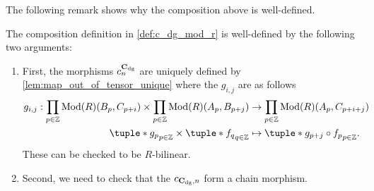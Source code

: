 The following remark shows why the composition above is well-defined.

\begin{remark}
    The composition definition in \autoref{def:c_dg_mod_r} is well-defined by the following two arguments:

    \begin{enumerate}
        \item {
            First, the morphisms \( c_n^{\operatorname{\mathbf{C}}_{\operatorname{dg}}} \) are uniquely defined by \autoref{lem:map_out_of_tensor_unique} where the \( g_{i, j} \) are as follows
            \begin{align*}
                g_{i, j}: \prod_{p \in \Zb} \Mod(R)(B_p, C_{p + i}) \times \prod_{p \in \Zb} \Mod(R)(A_p, B_{p + j}) &\to \prod_{p \in \Zb} \Mod(R)(A_p, C_{p + i + j}) \\
                \tuple*{ g_p }_{p \in \Zb} \times \tuple*{ f_q }_{q \in \Zb} &\mapsto \tuple*{ g_{p + j} \circ f_p }_{p \in \Zb}.
            \end{align*}
            These can be checked to be \( R \)-bilinear.
        }
        \item {
            Second, we need to check that the \( c_{\operatorname{\mathbf{C}}_{\operatorname{dg}}, n} \) form a chain morphism.

}
\end{enumerate}
\end{remark}
